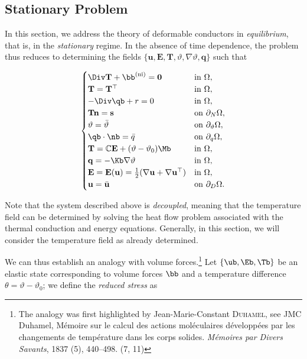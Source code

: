 \subsection{Stationary Problem}
In this section, we address the theory of deformable conductors in \textit{equilibrium}, that is, in the \textit{stationary} regime. In the absence of time dependence, the problem thus reduces to determining the fields \( \{ \mathbf{u}, \mathbf{E}, \mathbf{T}, \vartheta, \nabla\vartheta, \mathbf{q} \} \) such that 
\begin{definition}
	\begin{equation}
		\begin{cases}
			\Div\mathbf{T}+\bb^{({\rm ni})}=\mathbf{0}&\mathrm{in~}\Omega,\\
			\mathbf{T}=\mathbf{T}^\top&\mathrm{in~}\Omega,\\
			-\Div \qb +r=0 &\mathrm{in~}\Omega,\\
			\mathbf{T}\mathbf{n}=\mathbf{s}&\mathrm{on~}\partial_{N}\Omega,\\
			\vartheta=\bar{\vartheta}&\mathrm{on~}\partial_{\vartheta}\Omega,\\
			\qb\cdot \nb=\bar{q} &\mathrm{on~}\partial_{q}\Omega,\\
			\mathbf{T}=\mathbb{C}\mathbf{E}+(\vartheta-\vartheta_0)\Mb&\mathrm{in~}\Omega,\\
			\mathbf{q}=-\Kb \nabla\vartheta&\mathrm{in~}\Omega,\\
			\mathbf{E}=\mathbf{E}(\mathbf{u})=\frac{1}{2}(\nabla\mathbf{u}+\nabla\mathbf{u}^\top)&\mathrm{in~}\Omega,\\
			\mathbf{u}=\bar{\mathbf{u}}&\mathrm{on~}\partial_{D}\Omega.\\
		\end{cases}
	\end{equation}
\end{definition}

Note that the system described above is \textit{decoupled}, meaning that the temperature field can be determined by solving the heat flow problem associated with the thermal conduction and energy equations. 
Generally, in this section, we will consider the temperature field as already determined.

We can thus establish an analogy with volume forces.\footnote{The analogy was first highlighted by Jean-Marie-Constant \textsc{Duhamel}, see JMC Duhamel, Mémoire sur le calcul des actions moléculaires développées par les changements de température dans les corps solides. \textit{Mémoires par Divers Savants}, 1837 (5), 440--498.
	(7, 11)} Let $\{\ub, \Eb, \Tb\}$ be an elastic state corresponding to volume forces $\bb$ and a temperature difference $\theta = \vartheta - \vartheta_0$; we define the \textit{reduced stress} as

